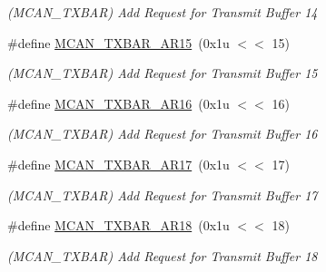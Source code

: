 \begin{DoxyCompactItemize}
\begin{DoxyCompactList}\small\item\em (M\+C\+A\+N\+\_\+\+T\+X\+B\+AR) Add Request for Transmit Buffer 14 \end{DoxyCompactList}\item 
\mbox{\label{group__SAME70__MCAN_ga388a8aa3552452d462fee1e4696b7d1b}} 
\#define \mbox{\hyperlink{group__SAME70__MCAN_ga388a8aa3552452d462fee1e4696b7d1b}{M\+C\+A\+N\+\_\+\+T\+X\+B\+A\+R\+\_\+\+A\+R15}}~(0x1u $<$$<$ 15)
\begin{DoxyCompactList}\small\item\em (M\+C\+A\+N\+\_\+\+T\+X\+B\+AR) Add Request for Transmit Buffer 15 \end{DoxyCompactList}\item 
\mbox{\label{group__SAME70__MCAN_ga05eaf47bd5ad65e78fb586cdf94fb755}} 
\#define \mbox{\hyperlink{group__SAME70__MCAN_ga05eaf47bd5ad65e78fb586cdf94fb755}{M\+C\+A\+N\+\_\+\+T\+X\+B\+A\+R\+\_\+\+A\+R16}}~(0x1u $<$$<$ 16)
\begin{DoxyCompactList}\small\item\em (M\+C\+A\+N\+\_\+\+T\+X\+B\+AR) Add Request for Transmit Buffer 16 \end{DoxyCompactList}\item 
\mbox{\label{group__SAME70__MCAN_gac2dbc9a8ad3237b2f6cda38b09e595d4}} 
\#define \mbox{\hyperlink{group__SAME70__MCAN_gac2dbc9a8ad3237b2f6cda38b09e595d4}{M\+C\+A\+N\+\_\+\+T\+X\+B\+A\+R\+\_\+\+A\+R17}}~(0x1u $<$$<$ 17)
\begin{DoxyCompactList}\small\item\em (M\+C\+A\+N\+\_\+\+T\+X\+B\+AR) Add Request for Transmit Buffer 17 \end{DoxyCompactList}\item 
\mbox{\label{group__SAME70__MCAN_gaba2f28aeda8e7ba09f16d23e28dbecbf}} 
\#define \mbox{\hyperlink{group__SAME70__MCAN_gaba2f28aeda8e7ba09f16d23e28dbecbf}{M\+C\+A\+N\+\_\+\+T\+X\+B\+A\+R\+\_\+\+A\+R18}}~(0x1u $<$$<$ 18)
\begin{DoxyCompactList}\small\item\em (M\+C\+A\+N\+\_\+\+T\+X\+B\+AR) Add Request for Transmit Buffer 18 \end{DoxyCompactList}\item 

\end{DoxyCompactItemize}
